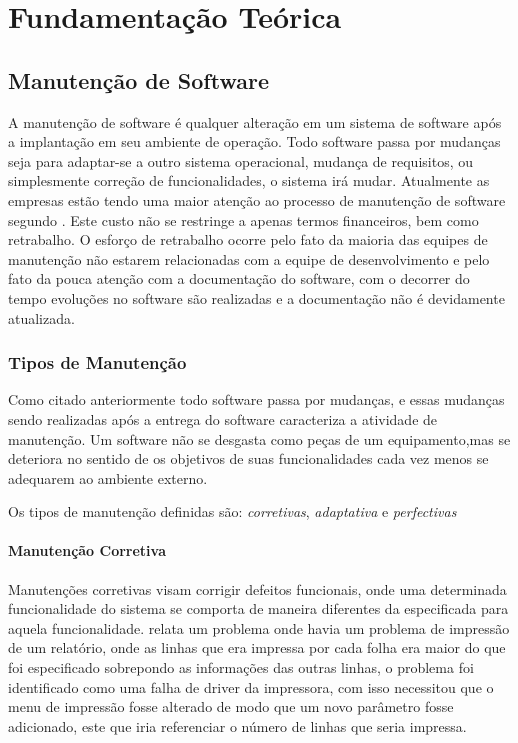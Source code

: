 \chapter{Fundamentação Teórica}\label{fundamentacao}

\section{Manutenção de Software}\label{manutencao}
A manutenção de software é qualquer alteração em um sistema de software após a implantação em seu ambiente de operação. Todo software passa por mudanças seja para adaptar-se a outro sistema operacional, mudança de requisitos, ou simplesmente correção de funcionalidades, o sistema irá mudar. Atualmente as empresas estão tendo uma maior atenção ao processo de manutenção de software segundo . Este custo não se restringe a apenas termos financeiros, bem como retrabalho. O esforço de retrabalho ocorre pelo fato da maioria das equipes de manutenção não estarem relacionadas com a equipe de desenvolvimento e pelo fato da pouca atenção com a documentação do software, com o decorrer do tempo evoluções no software são realizadas e a documentação não é devidamente atualizada.
\subsection{Tipos de Manutenção}
Como citado anteriormente todo software passa por mudanças, e essas mudanças sendo realizadas após a entrega do software caracteriza a atividade de manutenção. Um software não se desgasta como peças de um equipamento,mas se deteriora no sentido de os objetivos de suas funcionalidades cada vez menos se adequarem ao ambiente externo. 

Os tipos de manutenção definidas são: \textit{corretivas}, \textit{adaptativa} e \textit{perfectivas} 
\subsubsection{Manutenção Corretiva}
Manutenções corretivas visam corrigir defeitos funcionais, onde uma determinada funcionalidade do sistema se comporta de maneira diferentes da especificada para aquela funcionalidade.
 relata um problema onde havia um problema de impressão de um relatório, onde as linhas que era impressa por cada folha era maior do que foi especificado sobrepondo as informações das outras linhas, o problema foi identificado como uma falha de driver da impressora, com isso necessitou que o menu de impressão fosse alterado de modo que um novo parâmetro fosse adicionado, este que iria referenciar o número de linhas que seria impressa.
